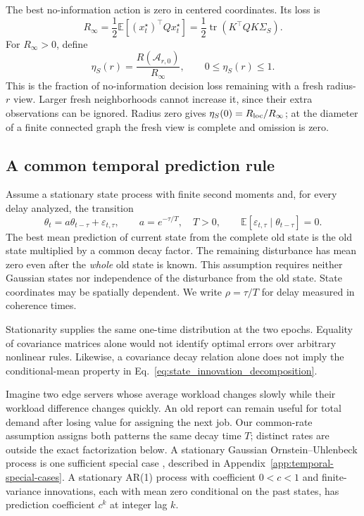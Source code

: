 \documentclass[11pt]{article}
\begin{document}
The best no-information action is zero in centered coordinates. Its loss is
\begin{equation}
R_\infty=\frac12\mathbb E[(x_t^\star)^\top Qx_t^\star]
=\frac12\operatorname{tr}(K^\top QK\Sigma_S).
\label{eq:Rinf_general}
\end{equation}
For $R_\infty>0$, define
\begin{equation}
\eta_S(r)=\frac{R(\mathcal A_{r,0})}{R_\infty},\qquad 0\le\eta_S(r)\le1.
\label{eq:eta_S_definition}
\end{equation}
This is the fraction of no-information decision loss remaining with a fresh
radius-$r$ view. Larger fresh neighborhoods cannot increase it, since their
extra observations can be ignored. Radius zero gives
$\eta_S(0)=R_{\rm loc}/R_\infty$; at the diameter of a finite connected
graph the fresh view is complete and omission is zero.

\subsection{A common temporal prediction rule}
\label{subsec:OU_model}

Assume a stationary state process with finite second moments and, for every
delay analyzed, the transition
\begin{equation}
\theta_t=a\theta_{t-\tau}+\varepsilon_{t,\tau},\qquad
a=e^{-\tau/T},\quad T>0,\qquad
\mathbb E[\varepsilon_{t,\tau}\mid\theta_{t-\tau}]=0.
\label{eq:state_innovation_decomposition}
\end{equation}
The best mean prediction of current state from the complete old state is
the old state multiplied by a common decay factor. The remaining disturbance
has mean zero even after the \emph{whole} old state is known. This assumption
requires neither Gaussian states nor independence of the disturbance from the old state.
State coordinates may be spatially dependent. We write $\rho=\tau/T$ for
delay measured in coherence times.

Stationarity supplies the same one-time distribution at the two epochs.
Equality of covariance matrices alone would not identify optimal errors
over arbitrary nonlinear rules. Likewise, a covariance decay relation alone
does not imply the conditional-mean property in
Eq.~\eqref{eq:state_innovation_decomposition}.

Imagine two edge servers whose average workload changes slowly while their
workload difference changes quickly. An old report can remain useful for
total demand after losing value for assigning the next job. Our common-rate
assumption assigns both patterns the same decay time $T$; distinct rates
are outside the exact factorization below. A stationary Gaussian
Ornstein--Uhlenbeck process is one sufficient special case
\cite{ornee2021ou}, described in Appendix~\ref{app:temporal-special-cases}.
A stationary AR(1) process with coefficient $0<c<1$ and finite-variance
innovations, each with mean zero conditional on the past states, has
prediction coefficient $c^k$ at integer lag $k$.
\end{document}
